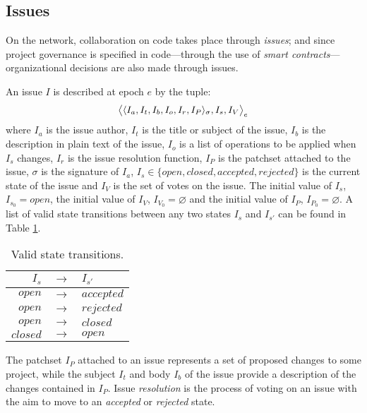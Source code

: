 \subsection{Issues}
\label{issues}

On the \oscoin{} network, collaboration on code takes place through \emph{issues};
and since project governance is specified in code---through the use of
\emph{smart contracts}---organizational decisions are also made through issues.


An issue $I$ is described at epoch $e$ by the tuple:
\[
    \big<\langle I_a, I_t, I_b, I_o, I_r, I_P \rangle_{\sigma}, I_s, I_V \big>_e
\]
where $I_a$ is the issue author, $I_t$ is the title or subject of the issue,
$I_b$ is the description in plain text of the issue, $I_o$ is a list of
operations to be applied when $I_s$ changes, $I_r$ is the issue resolution
function, $I_P$ is the patchset attached to the issue, $\sigma$ is the
signature of $I_a$, $I_s \in \{open, closed, accepted, rejected\}$ is the
current state of the issue and $I_V$ is the set of votes on the issue. The
initial value of $I_s$, $I_{s_0} = open$, the initial value of $I_V$, $I_{V_0}
= \varnothing$ and the initial value of $I_P$, $I_{P_0} = \varnothing$.  A list
of valid state transitions between any two states $I_s$ and $I_{s'}$ can be
found in Table \ref{issues-valid-transitions}.

\begin{table}[hbt]
    \caption{Valid state transitions.\label{issues-valid-transitions}}
    \begin{tabular}{rcl}
        \toprule
        $I_s$      & $\to$ & $I_{s'}$ \\
        \midrule
        $open$     & $\to$ & $accepted$ \\
        $open$     & $\to$ & $rejected$ \\
        $open$     & $\to$ & $closed$ \\
        $closed$   & $\to$ & $open$ \\
        \bottomrule
    \end{tabular}
\end{table}

The patchset $I_P$ attached to an issue represents a set of proposed changes to
some project, while the subject $I_t$ and body $I_b$ of the issue provide a
description of the changes contained in $I_P$. Issue \emph{resolution} is the
process of voting on an issue with the aim to move to an \emph{accepted} or
\emph{rejected} state.

